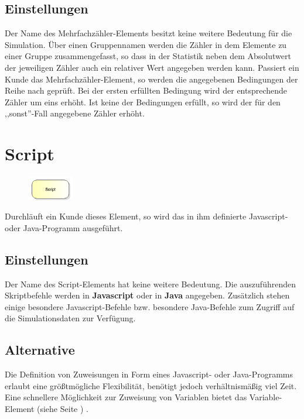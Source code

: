 \subsection*{Einstellungen}

Der Name des Mehrfachzähler-Elements besitzt keine weitere Bedeutung für die Simulation.
Über einen Gruppennamen werden die Zähler in dem Elemente zu einer Gruppe zusammengefasst,
so dass in der Statistik neben dem Absolutwert der jeweiligen Zähler auch ein relativer
Wert angegeben werden kann. Passiert ein Kunde das Mehrfachzähler-Element, so werden die
angegebenen Bedingungen der Reihe nach geprüft. Bei der ersten erfüllten Bedingung wird
der entsprechende Zähler um eins erhöht. Ist keine der Bedingungen erfüllt, so wird der
für den ,,sonst''-Fall angegebene Zähler erhöht. 


\section{Script}
\label{ref:ModelElementSetJS}

\begin{figure}
\vspace{-22pt}
\includegraphics[width=2cm]{imageModelElementSetJS.png}
\vspace{-22pt}
\end{figure}

Durchläuft ein Kunde dieses Element, so wird das in ihm definierte Javascript- oder Java-Programm ausgeführt.

\subsection*{Einstellungen}

Der Name des Script-Elements hat keine weitere Bedeutung. Die auszuführenden Skriptbefehle werden in
\textbf{Javascript} oder in \textbf{Java} angegeben. Zusätzlich stehen einige
besondere Javascript-Befehle bzw. besondere Java-Befehle 
zum Zugriff auf die Simulationsdaten zur Verfügung.

\subsection*{Alternative}

Die Definition von Zuweisungen in Form eines Javascript- oder Java-Programms erlaubt eine größtmögliche Flexibilität,
benötigt jedoch verhältnismäßig viel Zeit. Eine schnellere Möglichkeit zur Zuweisung von Variablen
bietet das Variable-Element (siehe Seite \pageref{ref:ModelElementSet}) .


